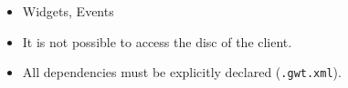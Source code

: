 \documentclass[10pt,table, xcolor=pdflatex]{beamer}
\begin{document}
\begin{frame}[fragile]
\begin{itemize}
          \begin{itemize}
          	\item Widgets, Events
            \item It is not possible to access the disc of the client.
            \item All dependencies must be explicitly declared (\texttt{.gwt.xml}).
          \end{itemize}
    \end{itemize}
\end{frame}
\end{document}
